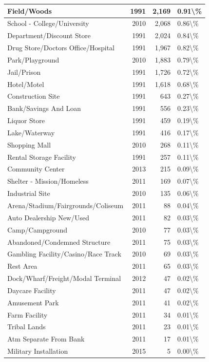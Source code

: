 \documentclass[
]{krantz}
\begin{document}
\begin{longtable}[t]{l|r|r|l}
\hline
Field/Woods & 1991 & 2,169 & 0.91\textbackslash{}\%\\
\hline
School - College/University & 2010 & 2,068 & 0.86\textbackslash{}\%\\
\hline
Department/Discount Store & 1991 & 2,024 & 0.84\textbackslash{}\%\\
\hline
Drug Store/Doctors Office/Hospital & 1991 & 1,967 & 0.82\textbackslash{}\%\\
\hline
Park/Playground & 2010 & 1,883 & 0.79\textbackslash{}\%\\
\hline
Jail/Prison & 1991 & 1,726 & 0.72\textbackslash{}\%\\
\hline
Hotel/Motel & 1991 & 1,618 & 0.68\textbackslash{}\%\\
\hline
Construction Site & 1991 & 643 & 0.27\textbackslash{}\%\\
\hline
Bank/Savings And Loan & 1991 & 556 & 0.23\textbackslash{}\%\\
\hline
Liquor Store & 1991 & 459 & 0.19\textbackslash{}\%\\
\hline
Lake/Waterway & 1991 & 416 & 0.17\textbackslash{}\%\\
\hline
Shopping Mall & 2010 & 268 & 0.11\textbackslash{}\%\\
\hline
Rental Storage Facility & 1991 & 257 & 0.11\textbackslash{}\%\\
\hline
Community Center & 2013 & 215 & 0.09\textbackslash{}\%\\
\hline
Shelter - Mission/Homeless & 2011 & 169 & 0.07\textbackslash{}\%\\
\hline
Industrial Site & 2010 & 135 & 0.06\textbackslash{}\%\\
\hline
Arena/Stadium/Fairgrounds/Coliseum & 2011 & 88 & 0.04\textbackslash{}\%\\
\hline
Auto Dealership New/Used & 2011 & 82 & 0.03\textbackslash{}\%\\
\hline
Camp/Campground & 2010 & 77 & 0.03\textbackslash{}\%\\
\hline
Abandoned/Condemned Structure & 2011 & 75 & 0.03\textbackslash{}\%\\
\hline
Gambling Facility/Casino/Race Track & 2010 & 69 & 0.03\textbackslash{}\%\\
\hline
Rest Area & 2011 & 65 & 0.03\textbackslash{}\%\\
\hline
Dock/Wharf/Freight/Modal Terminal & 2012 & 47 & 0.02\textbackslash{}\%\\
\hline
Daycare Facility & 2011 & 47 & 0.02\textbackslash{}\%\\
\hline
Amusement Park & 2011 & 41 & 0.02\textbackslash{}\%\\
\hline
Farm Facility & 2011 & 34 & 0.01\textbackslash{}\%\\
\hline
Tribal Lands & 2011 & 23 & 0.01\textbackslash{}\%\\
\hline
Atm Separate From Bank & 2011 & 17 & 0.01\textbackslash{}\%\\
\hline
Military Installation & 2015 & 5 & 0.00\textbackslash{}\%\\
\hline
\end{longtable}
\end{document}

